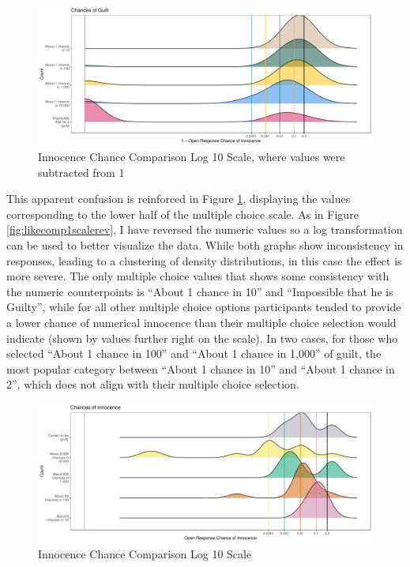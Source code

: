 \documentclass[print]{nuthesis}
\begin{document}
\begin{figure}

{\centering \includegraphics[width=\linewidth]{thesis_files/figure-latex/likecomp2scale-1} 

}

\caption{Innocence Chance Comparison Log 10 Scale, where values were subtracted from 1}\label{fig:likecomp2scale}
\end{figure}

This apparent confusion is reinforced in Figure \ref{fig:likecomp2scale}, displaying the values corresponding to the lower half of the multiple choice scale.
As in Figure \ref{fig:likecomp1scalerev}, I have reversed the numeric values so a log transformation can be used to better visualize the data.
While both graphs show inconsistency in responses, leading to a clustering of density distributions, in this case the effect is more severe.
The only multiple choice values that shows some consistency with the numeric counterpoints is ``About 1 chance in 10'' and ``Impossible that he is Guilty'', while for all other multiple choice options participants tended to provide a lower chance of numerical innocence than their multiple choice selection would indicate (shown by values further right on the scale).
In two cases, for those who selected ``About 1 chance in 100'' and ``About 1 chance in 1,000'' of guilt, the most popular category between ``About 1 chance in 10'' and ``About 1 chance in 2'', which does not align with their multiple choice selection.

\begin{figure}

{\centering \includegraphics[width=\linewidth]{thesis_files/figure-latex/likecomp2scalerev-1} 

}

\caption{Innocence Chance Comparison Log 10 Scale}\label{fig:likecomp2scalerev}
\end{figure}
\end{document}
